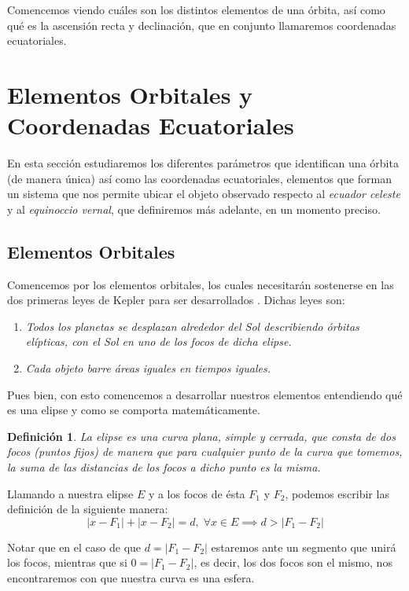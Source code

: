 \documentclass[11pt]{article}
\newtheorem{definition}[theorem]{Definición}
\begin{document}
Comencemos viendo cuáles son los distintos elementos de una órbita, así como qué es la ascensión recta y declinación, que en conjunto llamaremos coordenadas ecuatoriales.\\


\section{Elementos Orbitales y Coordenadas Ecuatoriales}
En esta sección estudiaremos los diferentes parámetros que identifican una órbita (de manera única) así como las coordenadas ecuatoriales, elementos que forman un sistema que nos permite ubicar el objeto observado respecto al \textit{ecuador celeste} y al \textit{equinoccio vernal}, que definiremos más adelante, en un momento preciso.\\

\subsection{Elementos Orbitales}
Comencemos por los elementos orbitales, los cuales necesitarán sostenerse en las dos primeras leyes de Kepler para ser desarrollados	. Dichas leyes son:

\begin{enumerate}
\item \textit{Todos los planetas se desplazan alrededor del Sol describiendo órbitas elípticas, con el Sol en uno de los focos de dicha elipse.}
\item \textit{Cada objeto barre áreas iguales en tiempos iguales.}
\end{enumerate}

Pues bien, con esto comencemos a desarrollar nuestros elementos entendiendo qué es una elipse y como se comporta matemáticamente.\\

\begin{definition}
La elipse es una curva plana, simple y cerrada, que consta de dos focos (puntos fijos) de manera que para cualquier punto de la curva que tomemos, la suma de las distancias de los focos a dicho punto es la misma.
\end{definition}

Llamando a nuestra elipse $E$ y a los focos de ésta $F_1$ y $F_2$, podemos escribir las definición de la siguiente manera:
\[
|x-F_1|+|x-F_2|=d, \; \forall x \in E \implies d>|F_1-F_2|
\]

Notar que en el caso de que $d=|F_1-F_2|$ estaremos ante un segmento que unirá los focos, mientras que si $0=|F_1-F_2|$, es decir, los dos focos son el mismo, nos encontraremos con que nuestra curva es una esfera.\\
\end{document}
